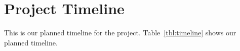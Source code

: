 \section{Project Timeline} \label{sec:timeline}

This is our planned timeline for the project. 
Table~\ref{tbl:timeline} shows our planned timeline.


